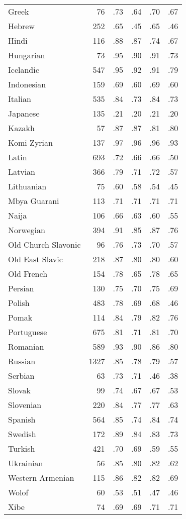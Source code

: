 \begin{longtable}{lrrrrr}
    Greek & 76 & .73 & .64 & .70 & .67 \\
    Hebrew & 252 & .65 & .45 & .65 & .46 \\
    Hindi & 116 & .88 & .87 & .74 & .67 \\
    Hungarian & 73 & .95 & .90 & .91 & .73 \\
    Icelandic & 547 & .95 & .92 & .91 & .79 \\
    Indonesian & 159 & .69 & .60 & .69 & .60 \\
    Italian & 535 & .84 & .73 & .84 & .73 \\
    Japanese & 135 & .21 & .20 & .21 & .20 \\
    Kazakh & 57 & .87 & .87 & .81 & .80 \\
    Komi Zyrian & 137 & .97 & .96 & .96 & .93 \\
    Latin & 693 & .72 & .66 & .66 & .50 \\
    Latvian & 366 & .79 & .71 & .72 & .57 \\
    Lithuanian & 75 & .60 & .58 & .54 & .45 \\
    Mbya Guarani & 113 & .71 & .71 & .71 & .71 \\
    Naija & 106 & .66 & .63 & .60 & .55 \\
    Norwegian & 394 & .91 & .85 & .87 & .76 \\
    Old Church Slavonic & 96 & .76 & .73 & .70 & .57 \\
    Old East Slavic & 218 & .87 & .80 & .80 & .60 \\
    Old French & 154 & .78 & .65 & .78 & .65 \\
    Persian & 130 & .75 & .70 & .75 & .69 \\
    Polish & 483 & .78 & .69 & .68 & .46 \\
    Pomak & 114 & .84 & .79 & .82 & .76 \\
    Portuguese & 675 & .81 & .71 & .81 & .70 \\
    Romanian & 589 & .93 & .90 & .86 & .80 \\
    Russian & 1327 & .85 & .78 & .79 & .57 \\
    Serbian & 63 & .73 & .71 & .46 & .38 \\
    Slovak & 99 & .74 & .67 & .67 & .53 \\
    Slovenian & 220 & .84 & .77 & .77 & .63 \\
    Spanish & 564 & .85 & .74 & .84 & .74 \\
    Swedish & 172 & .89 & .84 & .83 & .73 \\
    Turkish & 421 & .70 & .69 & .59 & .55 \\
    Ukrainian & 56 & .85 & .80 & .82 & .62 \\
    Western Armenian & 115 & .86 & .82 & .82 & .69 \\
    Wolof & 60 & .53 & .51 & .47 & .46 \\
    Xibe & 74 & .69 & .69 & .71 & .71 \\
\end{longtable}


